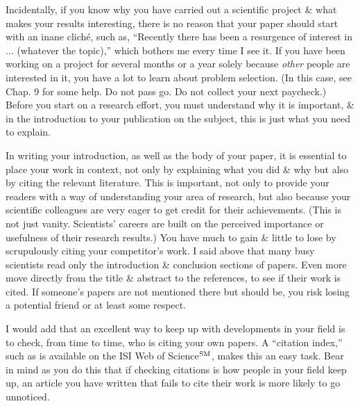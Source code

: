 \documentclass{article}
\begin{document}
\begin{enumerate}
\begin{itemize}
\begin{itemize}
			Incidentally, if you know why you have carried out a scientific project \& what makes your results interesting, there is no reason that your paper should start with an inane clich\'e, such as, ``Recently there has been a resurgence of interest in $\ldots$ (whatever the topic),'' which bothers me every time I see it. If you have been working on a project for several months or a year solely because \textit{other} people are interested in it, you have a lot to learn about problem selection. (In this case, see Chap. 9 for some help. Do not pass go. Do not collect your next paycheck.) Before you start on a research effort, you must understand why it is important, \& in the introduction to your publication on the subject, this is just what you need to explain.

			In writing your introduction, as well as the body of your paper, it is essential to place your work in context, not only by explaining what you did \& why but also by citing the relevant literature. This is important, not only to provide your readers with a way of understanding your area of research, but also because your scientific colleagues are very eager to get credit for their achievements. (This is not just vanity. Scientists' careers are built on the perceived importance or usefulness of their research results.) You have much to gain \& little to lose by scrupulously citing your competitor's work. I said above that many busy scientists read only the introduction \& conclusion sections of papers. Even more move directly from the title \& abstract to the references, to see if their work is cited. If someone's papers are not mentioned there but should be, you risk losing a potential friend or at least some respect.

			I would add that an excellent way to keep up with developments in your field is to check, from time to time, who is citing your own papers. A ``citation index,'' such as is available on the ISI Web of Science${}^{\rm SM}$, makes this an easy task. Bear in mind as you do this that if checking citations is how people in your field keep up, an article you have written that fails to cite their work is more likely to go unnoticed.


\end{itemize}
\end{itemize}
\end{enumerate}
\end{document}
